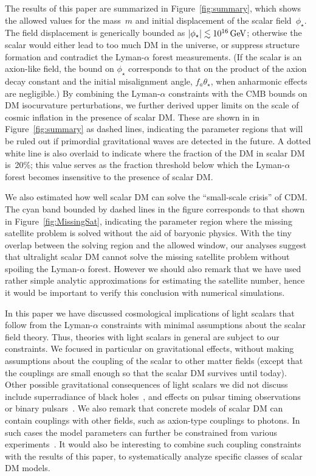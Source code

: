 \documentclass[11pt,nofootinbib]{article}
\numberwithin{equation}{section}
\begin{document}
The results of this paper are summarized in Figure~\ref{fig:summary},
which shows the allowed values for the mass~$m$ and
initial displacement of the scalar field~$\phi_\star$.
The field displacement is generically bounded as
$\lvert\phi_\star\rvert \lesssim 10^{16}\, \mathrm{GeV}$;
otherwise the scalar would either lead to too much DM in the universe,
or suppress structure formation and contradict
the Lyman-$\alpha$ forest measurements.
(If the scalar is an axion-like field, the bound on $\phi_\star$
corresponds to that on the product of the axion decay constant and
the initial misalignment angle, $f_a \theta_\star$, when anharmonic effects
are negligible.) 
By combining the Lyman-$\alpha$ constraints with the CMB bounds on DM
isocurvature perturbations, we further derived upper limits on the
scale of cosmic inflation in the presence of scalar DM.
These are shown in in Figure~\ref{fig:summary} as dashed lines,
indicating the parameter 
regions that will be ruled out if primordial gravitational waves are
detected in the future.
A dotted white line is also overlaid to indicate where the fraction of
the DM in scalar DM is~20\%;
this value serves as the fraction threshold below which the
Lyman-$\alpha$ forest becomes insensitive to the presence of scalar DM.

We also estimated how well scalar DM can solve the
``small-scale crisis'' of CDM.
The cyan band bounded by dashed lines in the figure
corresponds to that shown in Figure~\ref{fig:MissingSat},
indicating the
parameter region where the 
missing satellite problem is solved without the aid of baryonic physics.
With the tiny overlap between the solving region and the allowed window,
our analyses suggest that ultralight scalar DM cannot solve the 
missing satellite problem without spoiling the Lyman-$\alpha$ forest.
However we should also remark that we have used
rather simple analytic approximations for estimating the satellite
number, hence it would be important to verify this conclusion with
numerical simulations.

In this paper we have discussed cosmological implications of light scalars
that follow from the Lyman-$\alpha$ constraints with minimal
assumptions about the scalar field theory.
Thus, theories with light scalars in general are subject to our constraints.
We  focused in particular on gravitational effects, without making
assumptions about the coupling of the scalar to other 
matter fields
(except  that the couplings are small enough so that the scalar DM
survives until today).
Other possible gravitational consequences of light scalars we did not
discuss include superradiance of black
holes~\cite{Arvanitaki:2009fg,Arvanitaki:2010sy}, 
and effects on pulsar timing observations~\cite{Khmelnitsky:2013lxt}
or binary pulsars~\cite{Blas:2016ddr}.
We also remark that concrete models of scalar DM can contain
couplings with other fields, such as axion-type couplings to photons.
In such cases the model parameters can further be constrained from
various experiments~\cite{Ringwald:2012hr}.
It would also be interesting to combine such coupling constraints with the
results of this paper, to systematically analyze
specific classes of scalar DM models.
\end{document}

